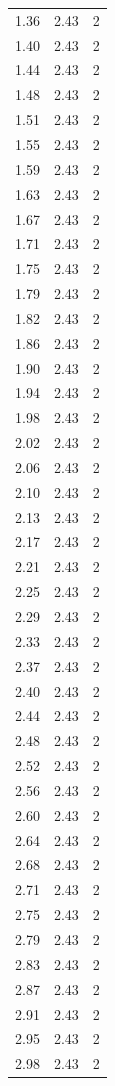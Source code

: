 \begin{longtable}{lrr}
  1.36 & 2.43 & 2 \\
  1.40 & 2.43 & 2 \\
  1.44 & 2.43 & 2 \\
  1.48 & 2.43 & 2 \\
  1.51 & 2.43 & 2 \\
  1.55 & 2.43 & 2 \\
  1.59 & 2.43 & 2 \\
  1.63 & 2.43 & 2 \\
  1.67 & 2.43 & 2 \\
  1.71 & 2.43 & 2 \\
  1.75 & 2.43 & 2 \\
  1.79 & 2.43 & 2 \\
  1.82 & 2.43 & 2 \\
  1.86 & 2.43 & 2 \\
  1.90 & 2.43 & 2 \\
  1.94 & 2.43 & 2 \\
  1.98 & 2.43 & 2 \\
  2.02 & 2.43 & 2 \\
  2.06 & 2.43 & 2 \\
  2.10 & 2.43 & 2 \\
  2.13 & 2.43 & 2 \\
  2.17 & 2.43 & 2 \\
  2.21 & 2.43 & 2 \\
  2.25 & 2.43 & 2 \\
  2.29 & 2.43 & 2 \\
  2.33 & 2.43 & 2 \\
  2.37 & 2.43 & 2 \\
  2.40 & 2.43 & 2 \\
  2.44 & 2.43 & 2 \\
  2.48 & 2.43 & 2 \\
  2.52 & 2.43 & 2 \\
  2.56 & 2.43 & 2 \\
  2.60 & 2.43 & 2 \\
  2.64 & 2.43 & 2 \\
  2.68 & 2.43 & 2 \\
  2.71 & 2.43 & 2 \\
  2.75 & 2.43 & 2 \\
  2.79 & 2.43 & 2 \\
  2.83 & 2.43 & 2 \\
  2.87 & 2.43 & 2 \\
  2.91 & 2.43 & 2 \\
  2.95 & 2.43 & 2 \\
  2.98 & 2.43 & 2 \\

\end{longtable}
